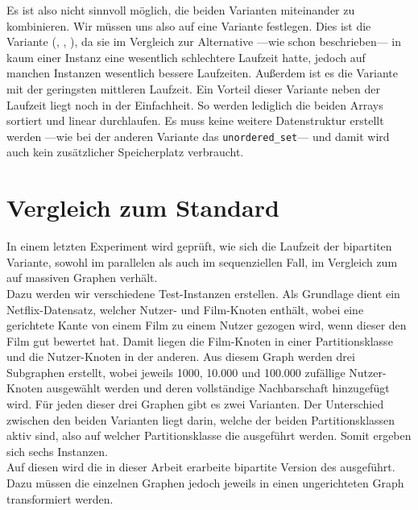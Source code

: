 Es ist also nicht sinnvoll möglich, die beiden Varianten miteinander zu kombinieren. Wir müssen uns
also auf eine Variante festlegen. Dies ist die Variante (\SorSor, \true, \distr), da sie im Vergleich zur
Alternative ---wie schon beschrieben---
in kaum einer Instanz eine wesentlich schlechtere Laufzeit hatte, jedoch auf manchen Instanzen wesentlich
bessere Laufzeiten. Außerdem ist es die Variante mit der geringsten mittleren Laufzeit. 
Ein Vorteil dieser Variante neben der Laufzeit liegt noch in der Einfachheit. So werden
lediglich die beiden Arrays sortiert und linear durchlaufen. Es muss keine weitere Datenstruktur
erstellt werden ---wie bei der anderen Variante das \texttt{unordered\_set}--- und damit wird
auch kein zusätzlicher Speicherplatz verbraucht.




\section{Vergleich zum Standard \cb{}}
\label{kap:result}
In einem letzten Experiment wird geprüft, wie sich die Laufzeit der bipartiten \gc{}
Variante, sowohl im parallelen als auch im sequenziellen Fall,
 im Vergleich zum \cb{} auf massiven Graphen verhält.
\\

Dazu werden wir verschiedene Test-Instanzen erstellen.
Als Grundlage dient ein Netflix-Datensatz\cite{kaggle}, welcher Nutzer- und Film-Knoten enthält, 
wobei eine gerichtete Kante von einem Film zu einem Nutzer gezogen wird, wenn dieser den 
Film gut bewertet hat. Damit liegen die Film-Knoten in einer Partitionsklasse und 
die Nutzer-Knoten in der anderen.
Aus diesem Graph werden drei Subgraphen erstellt, wobei jeweils 1000, 10.000 und 100.000  zufällige
Nutzer-Knoten ausgewählt werden und deren vollständige Nachbarschaft hinzugefügt wird.
Für jeden dieser drei Graphen gibt es zwei Varianten. Der Unterschied
zwischen den beiden Varianten liegt darin, welche der beiden Partitionsklassen aktiv sind, 
also auf welcher Partitionsklasse die  ausgeführt werden.
Somit ergeben sich sechs Instanzen. 
\\

Auf diesen wird 
die in dieser Arbeit erarbeite bipartite Version des \gc{} ausgeführt. Dazu müssen die
einzelnen Graphen jedoch jeweils in einen ungerichteten Graph transformiert werden.
\\


